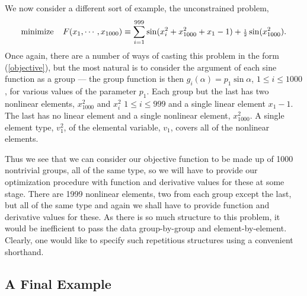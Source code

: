 \documentclass[a4paper]{article}
\newcommand{\beqn}[1]{\begin{equation}\label{#1}}
\newcommand{\eeqn}{\end{equation}}
\newcommand{\req}[1]{(\ref{#1})}
\newcommand{\ms}{\;\;\;\;}
\newcommand{\sfrac}[2]{{\scriptstyle \frac{#1}{#2}}}
\newcommand{\half}{\sfrac{1}{2}}
\begin{document}
We   now  consider a different   sort   of example, the  unconstrained
problem,
\beqn{1.5.1}
{\rm minimize} \ms  F(x_1,\cdots,x_{1000})
\equiv \sum_{i = 1}^{999} \sin(x_i^2 + x_{1000}^2 + x_1 - 1)
        + \half \sin(x_{1000}^2).
\eeqn
Once again, there are a number of ways of  casting this problem in the
form \req{objective}, but the most natural is to consider the argument
of each sine function as a group --- the group  function
is  then $g_i
(\alpha ) =  p_1 \sin \alpha  $, $1 \leq  i \leq   1000$,  for various
values of  the parameter
$p_1$.  Each  group but  the   last  has two
nonlinear elements, $x_{1000}^2$ and $x_i^2$ $1 \leq i \leq 999$ and a
single linear element $x_1 - 1$.  The last has no linear element and a
single  nonlinear  element, $x_{1000}^2$.     A single   element type,
$v_1^2$, of the elemental variable,
$v_1$, covers all of the nonlinear elements.

Thus we see that we can consider our  objective function
to be made up of 1000 nontrivial  groups, all of  the same type,
so we
will have to  provide  our optimization  procedure  with function  and
derivative values
for these at some stage.  There  are 1999 nonlinear elements,
two from
each group
except the last,  but all of the  same  type and again we shall have to
provide function and derivative 
values for these.  As there is so  much  structure
to this problem, it
would  be    inefficient   to  pass   the  data   group-by-group   and
element-by-element.   Clearly,  one   would  like to    specify   such
repetitious structures using a convenient shorthand.

\subsection{\label{S1.6}A Final Example}
\end{document}

